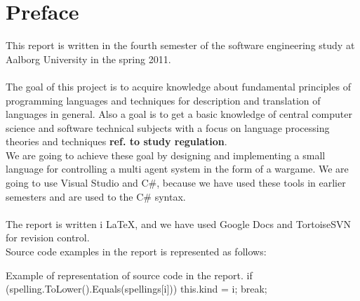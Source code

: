 \chapter*{Preface}
This report is written in the fourth semester of the software engineering study at Aalborg University in the spring 2011.
\\
\\
The goal of this project is to acquire knowledge about fundamental principles of programming languages and techniques for description and translation of languages in general. Also a goal is to get a basic knowledge of central computer science and software technical subjects with a focus on language processing theories and techniques \textbf{ref. to study regulation}.\\
  We are going to achieve these goal by designing and implementing a small language for controlling a multi agent system in the form of a wargame. We are going to use Visual Studio and C\#, because we have used these tools in earlier semesters and are used to the C\# syntax.
	\\
	\\
	The report is written i \LaTeX, and we have used Google Docs and TortoiseSVN for revision control.
	\\

Source code examples in the report is represented as follows:
\begin{source}{Example of representation of source code in the report.}{}
if (spelling.ToLower().Equals(spellings[i]))
	{
		this.kind = i;
		break;
	}
\end{source}
